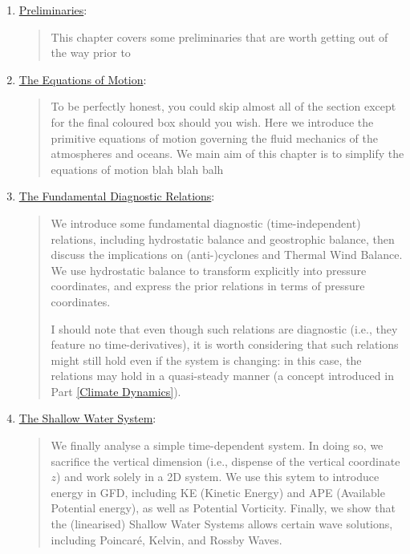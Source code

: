 \begin{enumerate}
    \item \hyperref[Prelim GFD]{Preliminaries}: 
        
        \begin{quote}
            This chapter covers some preliminaries that are worth getting out of the way prior to 
        \end{quote}

    \item \hyperref[EoM GFD]{The Equations of Motion}: 
    
        \begin{quote}
            To be perfectly honest, you could skip almost all of the section except for the final coloured box should you wish. Here we introduce the primitive equations of motion governing the fluid mechanics of the atmospheres and oceans. We main aim of this chapter is to simplify the equations of motion blah blah balh
        \end{quote}
    
    \item \hyperref[Dia Relations]{The Fundamental Diagnostic Relations}:
        
        \begin{quote}
            We introduce some fundamental diagnostic (time-independent) relations, including hydrostatic balance and geostrophic balance, then discuss the implications on (anti-)cyclones and Thermal Wind Balance. We use hydrostatic balance to transform explicitly into pressure coordinates, and express the prior relations in terms of pressure coordinates.

            I should note that even though such relations are diagnostic (i.e., they feature no time-derivatives), it is worth considering that such relations might still hold even if the system is changing: in this case, the relations may hold in a quasi-steady manner (a concept introduced in Part \ref{Climate Dynamics}).
        \end{quote}
    
    \item \hyperref[Shallow Water System]{The Shallow Water System}:
        
        \begin{quote}
            We finally analyse a simple time-dependent system. In doing so, we sacrifice the vertical dimension (i.e., dispense of the vertical coordinate $z$) and work solely in a 2D system. We use this sytem to introduce energy in GFD, including KE (Kinetic Energy) and APE (Available Potential energy), as well as Potential Vorticity. Finally, we show that the (linearised) Shallow Water Systems allows certain wave solutions, including Poincaré, Kelvin, and Rossby Waves.
        \end{quote}
    

\end{enumerate}
